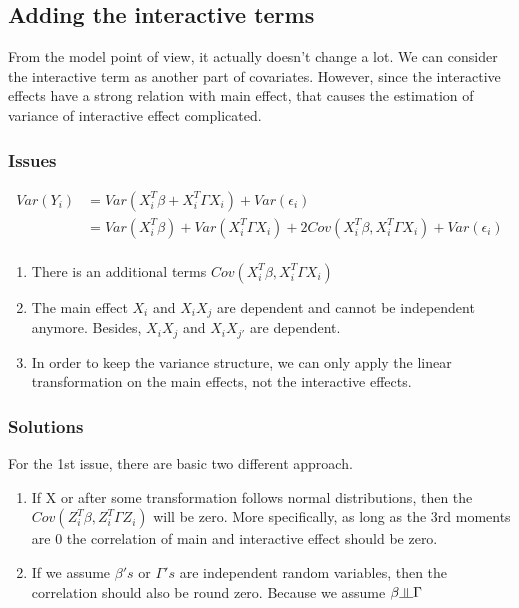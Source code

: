 \documentclass[]{article}
\providecommand{\tightlist}{%
  \setlength{\itemsep}{0pt}\setlength{\parskip}{0pt}}
\newcommand{\indep}{\rotatebox[origin=c]{90}{$\models$}}
\begin{document}
\subsection{Adding the interactive
terms}\label{adding-the-interactive-terms}

From the model point of view, it actually doesn't change a lot. We can
consider the interactive term as another part of covariates. However,
since the interactive effects have a strong relation with main effect,
that causes the estimation of variance of interactive effect
complicated.

\subsubsection{Issues}\label{issues}

\begin{align*}
Var(Y_i) &= Var(X_i^T\beta + X_i^T\Gamma X_i) + Var(\epsilon_i) \\
         &= Var(X_i^T\beta) + Var(X_i^T\Gamma X_i) + 2Cov(X_i^T\beta, X_i^T\Gamma X_i) + Var(\epsilon_i) \\
\end{align*}

\begin{enumerate}
\def\labelenumi{\arabic{enumi}.}
\tightlist
\item
  There is an additional terms \(Cov(X_i^T\beta, X_i^T\Gamma X_i)\)
\item
  The main effect \(X_i\) and \(X_i X_j\) are dependent and cannot be
  independent anymore. Besides, \(X_i X_j\) and \(X_i X_{j'}\) are
  dependent.
\item
  In order to keep the variance structure, we can only apply the linear
  transformation on the main effects, not the interactive effects.
\end{enumerate}

\subsubsection{Solutions}\label{solutions}

For the 1st issue, there are basic two different approach.

\begin{enumerate}
\def\labelenumi{\arabic{enumi}.}
\item
  If X or after some transformation follows normal distributions, then
  the \(Cov(Z_i^T\beta, Z_i^T\Gamma Z_i)\) will be zero. More
  specifically, as long as the 3rd moments are 0 the correlation of main
  and interactive effect should be zero.
\item
  If we assume \(\beta's\) or \(\Gamma's\) are independent random
  variables, then the correlation should also be round zero. Because we
  assume \(\beta \indep \Gamma\)
\end{enumerate}
\end{document}
